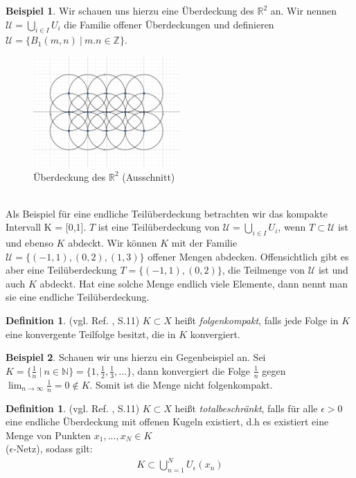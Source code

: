 \documentclass[10pt,a4paper]{article}
\theoremstyle{plain}
\theoremstyle{definition}
\newtheorem{definition}[satz]{Definition}
\newenvironment{dfi}{\begin{shaded}\begin{definition}}{\end{definition}\end{shaded}}
\theoremstyle{nonumberplain}
\newtheorem{beispiel}{Beispiel}
\newenvironment{bsp}{\begin{beispiel}}{\end{beispiel}}
\newcommand{\N}{\mathbb{N}}
\newcommand{\Z}{\mathbb{Z}}
\newcommand{\R}{\mathbb{R}}
\begin{document}
\begin{bsp}
Wir schauen uns hierzu eine Überdeckung des $\R^2$ an. Wir nennen $\mathcal{U} = \bigcup\limits_{i \in I}{U_i}$ die Familie offener Überdeckungen und definieren $\mathcal{U} = \{B_1(m,n)\: | \: m.n \in \Z\}$.
\begin{figure}[h]
\centering
\includegraphics[width=0.50\textwidth]{pictures/ueberdeckung-R2}
\caption{Überdeckung des $\R^2$ (Ausschnitt)}
\end{figure}
\quad\\
Als Beispiel für eine endliche Teilüberdeckung betrachten wir das kompakte Intervall K = [0,1]. $T$ ist eine Teilüberdeckung von $\mathcal{U}= \bigcup_{i \in I}{U_i}$, wenn $T \subset \mathcal{U}$ ist und ebenso $K$ abdeckt. Wir können $K$ mit der Familie $\mathcal{U} = \{(-1,1),(0,2),(1,3)\}$ offener Mengen abdecken. Offensichtlich gibt es aber eine Teilüberdeckung  $T = \{(-1,1),(0,2)\}$, die Teilmenge von $\mathcal{U}$ ist und auch $K$ abdeckt. Hat eine solche Menge endlich viele Elemente, dann nennt man sie eine endliche Teilüberdeckung.
\end{bsp}
\begin{dfi}
(vgl. Ref. \cite{Clason}, S.11) $K \subset X$ heißt \textit{folgenkompakt}, falls jede Folge in $K$ eine konvergente Teilfolge besitzt, die in $K$ konvergiert.
\end{dfi}
\begin{bsp}
Schauen wir uns hierzu ein Gegenbeispiel an. Sei $K = \{\frac{1}{n} \:| \: n \in \N\} = \{1, \frac{1}{2}, \frac{1}{3}, ...\}$, dann konvergiert die Folge $\frac{1}{n}$  gegen $\lim_{n \to \infty}{\frac{1}{n}} = 0 \notin K$. Somit ist die Menge nicht folgenkompakt.
\end{bsp}
\begin{dfi}
(vgl. Ref. \cite{Clason}, S.11) $K \subset X$ heißt \textit{totalbeschränkt}, falls für alle $\epsilon > 0$ eine endliche Überdeckung mit offenen Kugeln existiert, d.h es existiert eine Menge von Punkten $x_1, ..., x_N \in K$ \\($\epsilon$-Netz), sodass gilt:
\begin{align*} 
K \subset \bigcup_{n=1}^{N}{U_\epsilon(x_n)}
\end{align*} 
\end{dfi}
\end{document}
